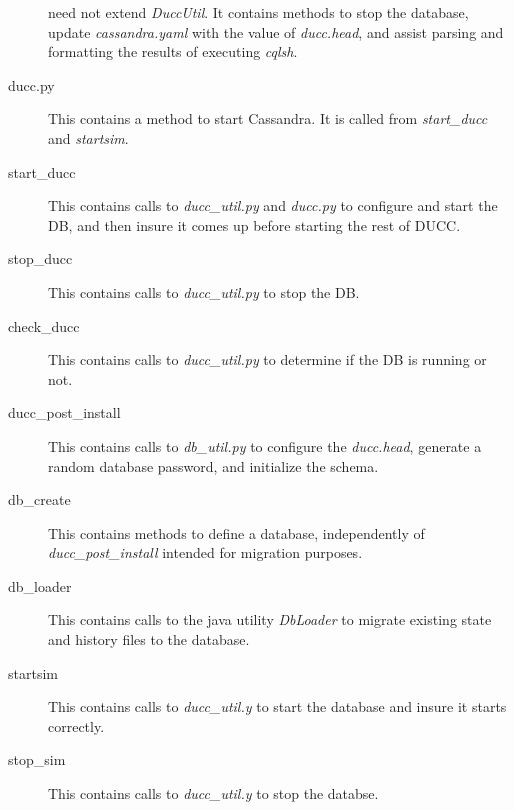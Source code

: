 \begin{description}
            need not extend {\em DuccUtil}.  It contains methods to stop the database, update 
            {\em cassandra.yaml} with the value of {\em ducc.head}, and assist parsing and formatting
            the results of executing {\em cqlsh}.
          \item[ducc.py] This contains a method to start Cassandra.  It is called from {\em start\_ducc}
            and {\em startsim}.
          \item[start\_ducc] This contains calls to {\em ducc\_util.py}  and {\em ducc.py} to configure
            and start the DB, and then insure it comes up before starting the rest of DUCC.
          \item[stop\_ducc] This contains calls to {\em ducc\_util.py} to stop the DB.
          \item[check\_ducc] This contains calls to {\em ducc\_util.py} to determine if the DB is running or not.
          \item[ducc\_post\_install] This contains calls to {\em db\_util.py} to configure the
            {\em ducc.head}, generate a random database password, and initialize the schema.
          \item[db\_create] This contains methods to define a database, independently of
            {\em ducc\_post\_install} intended for migration purposes.
          \item[db\_loader] This contains calls to the java utility {\em DbLoader} to
            migrate existing state and history files to the database.
          \item[startsim] This contains calls to {\em ducc\_util.y} to start the database and
            insure it starts correctly.
          \item[stop\_sim] This contains calls to {\em ducc\_util.y} to stop the databse.
          \end{description}
          

